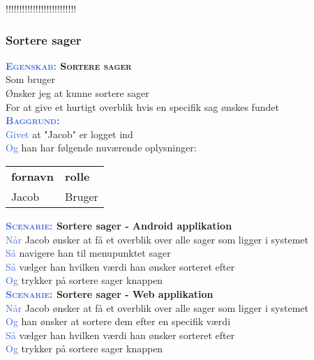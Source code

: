 !!!!!!!!!!!!!!!!!!!!!!!!!!

\subsubsection{Sortere sager}
\textbf{\textsc{\textcolor{RoyalBlue}{Egenskab:} Sortere sager}}\\
Som bruger\\
Ønsker jeg at kunne sortere sager\\
For at give et hurtigt overblik hvis en specifik sag ønskes fundet\\

\textsc{\textcolor{RoyalBlue}{\textbf{Baggrund:}}}\\
\textcolor{RoyalBlue}{Givet} at "Jacob" er logget ind\\
\textcolor{RoyalBlue}{Og} han har følgende nuværende oplysninger:\\
\begin{tabular}{| l | l |}
	\textbf{fornavn} & \textbf{rolle} \\
	Jacob & Bruger\\
\end{tabular}
\newline \newline

\textbf{\textsc{\textcolor{RoyalBlue}{Scenarie:}} Sortere sager - Android applikation}\\
\textcolor{RoyalBlue}{Når} Jacob ønsker at få et overblik over alle sager som ligger i systemet\\
\textcolor{RoyalBlue}{Så} navigere han til menupunktet sager\\
\textcolor{RoyalBlue}{Så} vælger han hvilken værdi han ønsker sorteret efter\\
\textcolor{RoyalBlue}{Og} trykker på sortere sager knappen\\

\textbf{\textsc{\textcolor{RoyalBlue}{Scenarie:}} Sortere sager - Web applikation}\\
\textcolor{RoyalBlue}{Når} Jacob ønsker at få et overblik over alle sager som ligger i systemet\\
\textcolor{RoyalBlue}{Og} han ønsker at sortere dem efter en specifik værdi\\
\textcolor{RoyalBlue}{Så} vælger han hvilken værdi han ønsker sorteret efter\\
\textcolor{RoyalBlue}{Og} trykker på sortere sager knappen\\


